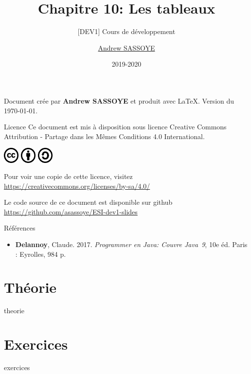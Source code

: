 \documentclass[utf8]{beamer}
\title{Chapitre 10: Les tableaux}
\subtitle{\tiny [DEV1] Cours de développement}
\author{\href{https://andrew.sassoye.be}{Andrew SASSOYE}}
\date{2019-2020}
\begin{document}
    \begin{frame}
        \titlepage
    \end{frame}

    \begin{frame}
        \center Document crée par \textbf{Andrew SASSOYE} et produit avec \LaTeX.
        \tiny Version du \today. \normalsize

        \begin{block}{Licence}
            Ce document est mis à disposition sous licence Creative Commons
            Attribution - Partage dans les Mêmes Conditions 4.0 International.

            \begin{center}
                \includegraphics[width=8mm]{./styles/images/cc}
                \includegraphics[width=8mm]{./styles/images/by}
                \includegraphics[width=8mm]{./styles/images/sa}
            \end{center}

            \center\tiny Pour voir une copie de cette licence, visitez
            \href{https://creativecommons.org/licenses/by-sa/4.0/}{https://creativecommons.org/licenses/by-sa/4.0/}
            \normalsize
        \end{block}

        \tiny Le code source de ce document est disponible sur github\\ \href{https://github.com/asassoye/ESI-dev1-slides}{https://github.com/asassoye/ESI-dev1-slides}

    \end{frame}

    \begin{frame}{Références}
        \begin{itemize}
            \item \textbf{Delannoy}, Claude. 2017. \textit{Programmer en Java: Couvre Java~9}, 10e éd. Paris : Eyrolles, 984 p.
        \end{itemize}
    \end{frame}

    \part{Théorie}
    {theorie}

    \part{Exercices}
    {exercices}
\end{document}
